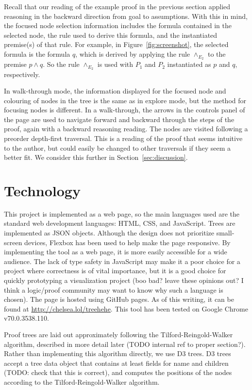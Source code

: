 \documentclass[conference]{IEEEtran}
\begin{document}
Recall that our reading of the example proof in the previous section applied reasoning in the backward direction from goal to assumptions. With this in mind, the focused node selection information includes the formula contained in the selected node, the rule used to derive this formula, and the instantiated premise(s) of that rule. For example, in Figure~\ref{fig:screenshot}, the selected formula is the formula $q$, which is derived by applying the rule $\wedge_{E_2}$ to the premise $p \wedge q$. So the rule $\wedge_{E_2}$ is used with $P_1$ and $P_2$ instantiated as $p$ and $q$, respectively.

In walk-through mode, the information displayed for the focused node and colouring of nodes in the tree is the same as in explore mode, but the method for focusing nodes is different. In a walk-through, the arrows in the controls panel of the page are used to navigate forward and backward through the steps of the proof, again with a backward reasoning reading. The nodes are visited following a preorder depth-first traversal. This is a reading of the proof that seems intuitive to the author, but could easily be changed to other traversals if they seem a better fit. We consider this further in Section~\ref{sec:discussion}.


\section{Technology}
\label{sec:technology}

This project is implemented as a web page, so the main languages used are the standard web development languages: HTML, CSS, and JavaScript. Trees are implemented as JSON objects. Although the design does not prioritize small-screen devices, Flexbox has been used to help make the page responsive. By implementing the tool as a web page, it is more easily accessible for a wide audience. The lack of type safety in JavaScript may make it a poor choice for a project where correctness is of vital importance, but it is a good choice for quickly prototyping a visualization project (boo bad? leave these opinions out? I think a logic/proof community may want to know why such a language is chosen). The page is hosted using GitHub pages. As of this writing, it can be found at \url{http://chelsea.lol/treehehe}. This tool has been tested on Google Chrome v70.0.3538.110.

Proof trees are laid out approximately following the Tilford-Reingold-Walker algorithm, described in more detail later (TODO internal ref to proper section?). Rather than implementing this algorithm directly, we use D3 trees. D3 trees accept a tree data object that contains at least fields for name and children (TODO: check that this is correct), and computes the positions of the nodes according to the Tilford-Reingold-Walker algorithm.
\end{document}
